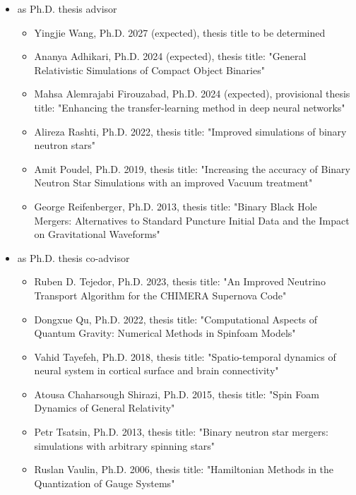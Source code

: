 \documentclass[11pt]{article}
\begin{document}
\begin{itemize}
\item	as Ph.D. thesis advisor
	\begin{itemize}
	\item	Yingjie Wang, Ph.D. 2027 (expected),
		thesis title to be determined
	\item	Ananya Adhikari, Ph.D. 2024 (expected),
		thesis title:
		"General Relativistic Simulations of Compact Object Binaries"
	\item	Mahsa Alemrajabi Firouzabad, Ph.D. 2024 (expected),
		provisional thesis title:
		"Enhancing the transfer-learning method in deep
		neural networks"
	\item	Alireza Rashti, Ph.D. 2022,
		thesis title:
		"Improved simulations of binary neutron stars"
	\item	Amit Poudel, Ph.D. 2019,
		thesis title:
		"Increasing the accuracy of Binary Neutron Star Simulations
		with an improved Vacuum treatment"
	\item	George Reifenberger, Ph.D. 2013,
		thesis title:
		"Binary Black Hole Mergers: Alternatives to Standard
		Puncture Initial Data and the Impact on Gravitational Waveforms"
	\end{itemize}
\item	as Ph.D. thesis co-advisor
	\begin{itemize}
	\item	Ruben D. Tejedor, Ph.D. 2023,
		thesis title:
		"An Improved Neutrino Transport Algorithm for the
		CHIMERA Supernova Code"
	\item	Dongxue Qu, Ph.D. 2022,
		thesis title:
		"Computational Aspects of Quantum Gravity:
		Numerical Methods in Spinfoam Models"
	\item	Vahid Tayefeh, Ph.D. 2018,
		thesis title:
		"Spatio-temporal dynamics of neural system in cortical
		surface and brain connectivity"
	\item	Atousa Chaharsough Shirazi, Ph.D. 2015,
		thesis title:
		"Spin Foam Dynamics of General Relativity"
	\item	Petr Tsatsin, Ph.D. 2013,
		thesis title:
		"Binary neutron star mergers: simulations with
		 arbitrary spinning stars"
	\item	Ruslan Vaulin, Ph.D. 2006,
		thesis title: 
		"Hamiltonian Methods in the Quantization of Gauge Systems"

\end{itemize}
\end{itemize}
\end{document}

